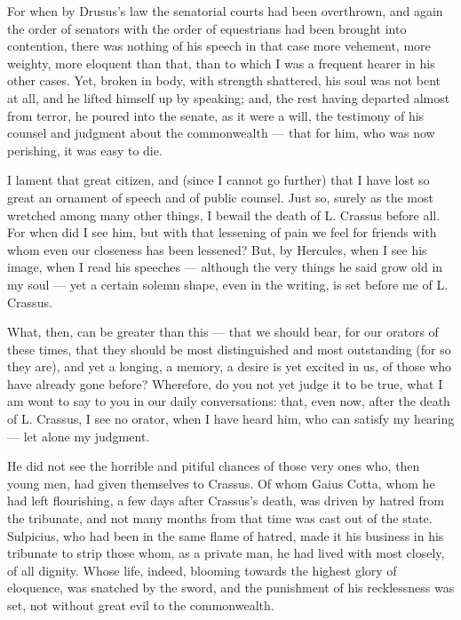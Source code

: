  For when by Drusus's law the senatorial courts had been overthrown, and again the order of senators with the order of equestrians had been brought into contention, there was nothing of his speech in that case more vehement, more weighty, more eloquent than that, than to which I was a frequent hearer in his other cases. Yet, broken in body, with strength shattered, his soul was not bent at all, and he lifted himself up by speaking; and, the rest having departed almost from terror, he poured into the senate, as it were a will, the testimony of his counsel and judgment about the commonwealth — that for him, who was now perishing, it was easy to die.

 I lament that great citizen, and (since I cannot go further) that I have lost so great an ornament of speech and of public counsel. Just so, surely as the most wretched among many other things, I bewail the death of L. Crassus before all. For when did I see him, but with that lessening of pain we feel for friends with whom even our closeness has been lessened? But, by Hercules, when I see his image, when I read his speeches — although the very things he said grow old in my soul — yet a certain solemn shape, even in the writing, is set before me of L. Crassus.

 What, then, can be greater than this — that we should bear, for our orators of these times, that they should be most distinguished and most outstanding (for so they are), and yet a longing, a memory, a desire is yet excited in us, of those who have already gone before? Wherefore, do you not yet judge it to be true, what I am wont to say to you in our daily conversations: that, even now, after the death of L. Crassus, I see no orator, when I have heard him, who can satisfy my hearing — let alone my judgment.

 He did not see the horrible and pitiful chances of those very ones who, then young men, had given themselves to Crassus. Of whom Gaius Cotta, whom he had left flourishing, a few days after Crassus's death, was driven by hatred from the tribunate, and not many months from that time was cast out of the state. Sulpicius, who had been in the same flame of hatred, made it his business in his tribunate to strip those whom, as a private man, he had lived with most closely, of all dignity. Whose life, indeed, blooming towards the highest glory of eloquence, was snatched by the sword, and the punishment of his recklessness was set, not without great evil to the commonwealth.

